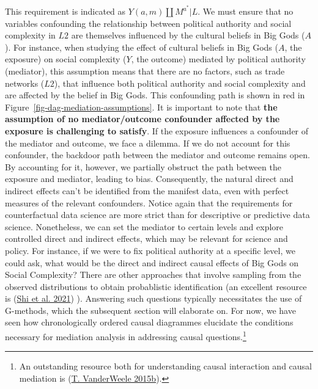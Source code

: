 \documentclass[
  singlecolumn]{report}
\begin{document}
This requirement is indicated as \(Y(a,m) \coprod M^{a^*} | L\). We must
ensure that no variables confounding the relationship between political
authority and social complexity in \(L2\) are themselves influenced by
the cultural beliefs in Big Gods (\(A\)). For instance, when studying
the effect of cultural beliefs in Big Gods (\(A\), the exposure) on
social complexity (\(Y\), the outcome) mediated by political authority
(mediator), this assumption means that there are no factors, such as
trade networks (\(L2\)), that influence both political authority and
social complexity and are affected by the belief in Big Gods. This
confounding path is shown in red in
Figure~\ref{fig-dag-mediation-assumptions}. It is important to note that
\textbf{the assumption of no mediator/outcome confounder affected by the
exposure is challenging to satisfy}. If the exposure influences a
confounder of the mediator and outcome, we face a dilemma. If we do not
account for this confounder, the backdoor path between the mediator and
outcome remains open. By accounting for it, however, we partially
obstruct the path between the exposure and mediator, leading to bias.
Consequently, the natural direct and indirect effects can't be
identified from the manifest data, even with perfect measures of the
relevant confounders. Notice again that the requirements for
counterfactual data science are more strict than for descriptive or
predictive data science. Nonetheless, we can set the mediator to certain
levels and explore controlled direct and indirect effects, which may be
relevant for science and policy. For instance, if we were to fix
political authority at a specific level, we could ask, what would be the
direct and indirect causal effects of Big Gods on Social Complexity?
There are other approaches that involve sampling from the observed
distributions to obtain probablistic identification (an excellent
resource is (\protect\hyperlink{ref-shi2021}{Shi et al. 2021}) ).
Answering such questions typically necessitates the use of G-methods,
which the subsequent section will elaborate on. For now, we have seen
how chronologically ordered causal diagrammes elucidate the conditions
necessary for mediation analysis in addressing causal
questions.\footnote{An outstanding resource both for understanding
  causal interaction and causal mediation is
  (\protect\hyperlink{ref-vanderweele2015a}{T. VanderWeele 2015b}).}
\end{document}
